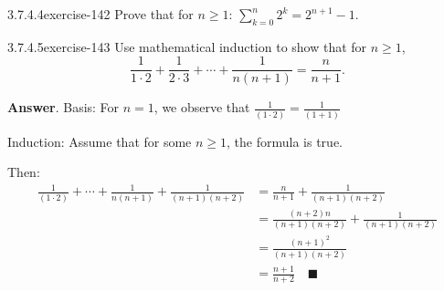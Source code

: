 \documentclass[twoside,10pt,]{book}
\numberwithin{equation}{section}
\begin{document}
\begin{divisionsolution}{3.7.4.4}{}{exercise-142}%
\hypertarget{p-1350}{}%
Prove that for \(n \geq  1\): \(\sum_{k=0}^n 2^k = 2^{n+1}-1\).%
\end{divisionsolution}%
\begin{divisionsolution}{3.7.4.5}{}{exercise-143}%
\hypertarget{p-1351}{}%
Use mathematical induction to show that for \(n\geq 1\),%
\begin{equation*}
\frac{1}{1\cdot 2 }+ \frac{1}{2\cdot 3}+ \cdots  + \frac{1}{n(n+1)}= \frac{n}{n+1}\text{.}
\end{equation*}
%
\par\smallskip%
\noindent\textbf{Answer}.\quad%
\hypertarget{p-1352}{}%
Basis:  For \(n=1\), we observe that \(\frac{1}{(1\cdot 2)}=\frac{1}{(1+1)}\)%
\par
\hypertarget{p-1353}{}%
Induction: Assume that for some \(n\geqslant 1\), the formula is true.%
\par
\hypertarget{p-1354}{}%
Then:%
\begin{equation*}
\begin{split}
\frac{1}{(1\cdot 2)}+\cdots +\frac{1}{n(n+1)} +\frac{1}{(n+1)(n+2)} &=\frac{n}{n+1}+\frac{1}{(n+1)(n+2)}\\
&=\frac{(n+2)n}{(n+1)(n+2)}+\frac{1}{(n+1)(n+2)}\\
&=\frac{(n+1)^2}{(n+1)(n+2)}\\
&=\frac{n+1}{n+2} \quad \blacksquare\\
\end{split}
\end{equation*}
%
\end{divisionsolution}%
\end{document}
